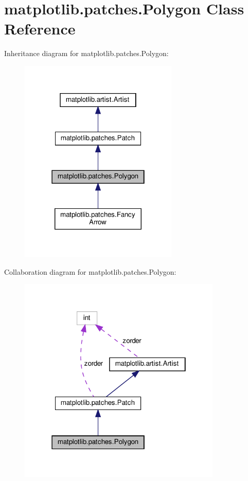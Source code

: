 \hypertarget{classmatplotlib_1_1patches_1_1Polygon}{}\section{matplotlib.\+patches.\+Polygon Class Reference}
\label{classmatplotlib_1_1patches_1_1Polygon}


Inheritance diagram for matplotlib.\+patches.\+Polygon\+:
\nopagebreak
\begin{figure}[H]
\begin{center}
\leavevmode
\includegraphics[width=214pt]{classmatplotlib_1_1patches_1_1Polygon__inherit__graph}
\end{center}
\end{figure}


Collaboration diagram for matplotlib.\+patches.\+Polygon\+:
\nopagebreak
\begin{figure}[H]
\begin{center}
\leavevmode
\includegraphics[width=274pt]{classmatplotlib_1_1patches_1_1Polygon__coll__graph}
\end{center}
\end{figure}
